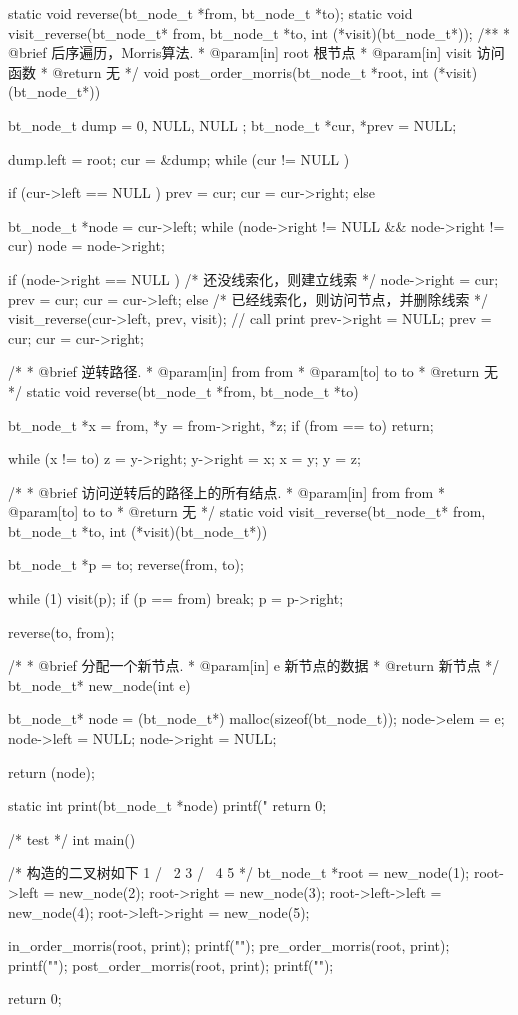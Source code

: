 \begin{Codex}[label=morris_traversal.c]
static void reverse(bt_node_t *from, bt_node_t *to);
static void visit_reverse(bt_node_t* from, bt_node_t *to,
        int (*visit)(bt_node_t*));
/**
 * @brief 后序遍历，Morris算法.
 * @param[in] root 根节点
 * @param[in] visit 访问函数
 * @return 无
 */
void post_order_morris(bt_node_t *root, int (*visit)(bt_node_t*)) {
    bt_node_t dump = { 0, NULL, NULL };
    bt_node_t *cur, *prev = NULL;

    dump.left = root;
    cur = &dump;
    while (cur != NULL ) {
        if (cur->left == NULL ) {
            prev = cur;
            cur = cur->right;
        } else {
            bt_node_t *node = cur->left;
            while (node->right != NULL && node->right != cur)
                node = node->right;

            if (node->right == NULL ) { /* 还没线索化，则建立线索 */
                node->right = cur;
                prev = cur;
                cur = cur->left;
            } else { /* 已经线索化，则访问节点，并删除线索  */
                visit_reverse(cur->left, prev, visit);  // call print
                prev->right = NULL;
                prev = cur;
                cur = cur->right;
            }
        }
    }
}

/*
 * @brief 逆转路径.
 * @param[in] from from
 * @param[to] to to
 * @return 无
 */
static void reverse(bt_node_t *from, bt_node_t *to) {
    bt_node_t *x = from, *y = from->right, *z;
    if (from == to) return;

    while (x != to) {
        z = y->right;
        y->right = x;
        x = y;
        y = z;
    }
}

/*
 * @brief  访问逆转后的路径上的所有结点.
 * @param[in] from from
 * @param[to] to to
 * @return 无
 */
static void visit_reverse(bt_node_t* from, bt_node_t *to,
        int (*visit)(bt_node_t*)) {
    bt_node_t *p = to;
    reverse(from, to);
    
    while (1) {
        visit(p);
        if (p == from)
            break;
        p = p->right;
    }

    reverse(to, from);
}

/*
 * @brief 分配一个新节点.
 * @param[in] e 新节点的数据
 * @return 新节点
 */
bt_node_t* new_node(int e) {
    bt_node_t* node = (bt_node_t*) malloc(sizeof(bt_node_t));
    node->elem = e;
    node->left = NULL;
    node->right = NULL;

    return (node);
}

static int print(bt_node_t *node) {
    printf(" %
    return 0;
}

/* test */
int main() {
    /* 构造的二叉树如下
       1
     /   \
    2      3
  /  \
4     5
     */
    bt_node_t *root = new_node(1);
    root->left = new_node(2);
    root->right = new_node(3);
    root->left->left = new_node(4);
    root->left->right = new_node(5);

    in_order_morris(root, print);
    printf("\n");
    pre_order_morris(root, print);
    printf("\n");
    post_order_morris(root, print);
    printf("\n");

    return 0;
}
\end{Codex}


